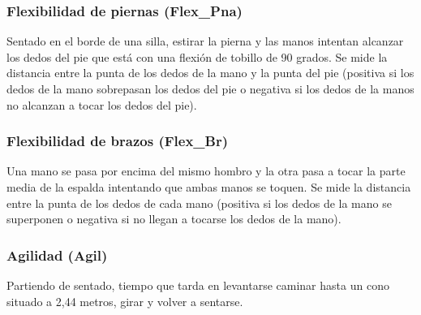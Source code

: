 
\subsubsection{Flexibilidad de piernas (Flex\_Pna)}

Sentado en el borde de una silla, estirar la pierna y las manos intentan alcanzar los dedos del pie que está con una flexión de tobillo de 90 grados. Se mide la distancia entre la punta de los dedos de la mano y la punta del pie (positiva si los dedos de la mano sobrepasan los dedos del pie o negativa si los dedos de la manos no alcanzan a tocar los dedos del pie).


\subsubsection{Flexibilidad de brazos (Flex\_Br)}

Una mano se pasa por encima del mismo hombro y la otra pasa a tocar la parte media de la espalda intentando que ambas manos se toquen. Se mide la distancia entre la punta de los dedos de cada mano (positiva si los dedos de la mano se superponen o negativa si no llegan a tocarse los dedos de la mano).


\subsubsection{Agilidad (Agil)}

Partiendo de sentado, tiempo que tarda en levantarse caminar hasta un cono situado a 2,44 metros, girar y volver a sentarse.

